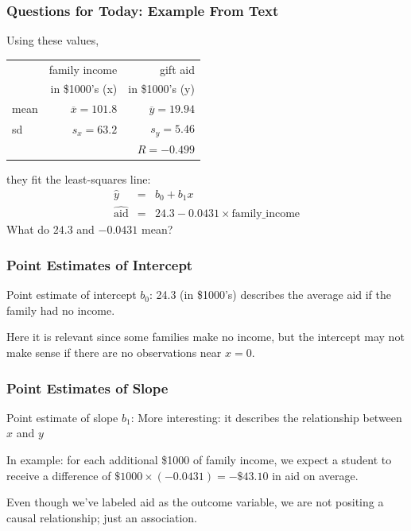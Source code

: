 \documentclass[handout]{beamer}
\newcommand{\blue}[1]{\textcolor{blue2}{#1}}
\begin{document}
\begin{frame}[fragile]
\frametitle{Questions for Today: Example From Text}
Using these values,
\begin{center}
\begin{tabular}{l|rr}
& family income & gift aid \\
& in \$1000's (x) & in \$1000's (y) \\ 
\hline
mean & $\overline{x}=101.8$ & $\overline{y}=19.94$ \\ 
sd & $s_x=63.2$ & $s_y=5.46$ \\ 
\hline
 &  & $R=-0.499$ \\ 
\hline
\end{tabular}
\end{center}

%
%
they fit the \blue{least-squares line}:
\pause
\begin{eqnarray*}
\widehat{y} &=& b_0 + b_1 x\\
\widehat{\mbox{aid}} &=& 24.3 - 0.0431 \times \mbox{family\_income}
\end{eqnarray*}
What do $24.3$ and $-0.0431$ mean?

\end{frame}


\begin{frame}[fragile]
\frametitle{Point Estimates of Intercept}
%
%
\blue{Point estimate of intercept $b_0$}: 24.3 (in \$1000's) describes the average aid if the family had no income.  

\vspace{0.25cm}
\pause
Here it is relevant since some families make no income, but the intercept may not make sense if there are no observations near $x=0$.  

\end{frame}


\begin{frame}[fragile]
\frametitle{Point Estimates of Slope}

%
%
\blue{Point estimate of slope $b_1$}: More interesting: it describes the \blue{relationship} between $x$ and $y$

\vspace{0.5cm}
\pause
In example: for each additional \$1000 of family income, we \blue{expect} a student to receive a difference of $\$1000 \times (-0.0431) = -\$43.10$ in aid on average.   

\vspace{0.5cm}
\pause
Even though we've labeled aid as the outcome variable, we are not positing a causal relationship; just an association.  


\end{frame}
\end{document}
